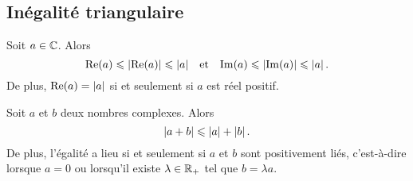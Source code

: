 \documentclass{magnoliaold}
\begin{document}
\subsection{Inégalité triangulaire}


\begin{proposition}[utile=-3]
Soit $a\in\mathbb{C}$. Alors
\[\mathop{\rm Re}(a)\leqslant\left|\mathop{\rm Re}(a)\right|\leqslant\left|a\right| \quad\!\text{et}\quad\!
  \mathop{\rm Im}(a)\leqslant\left|\mathop{\rm Im}(a)\right|\leqslant\left|a\right|.\]
De plus, $\mathop{\rm Re}(a)=\left|a\right|$ si et seulement si $a$ est réel positif.
\end{proposition}


\begin{proposition}[utile=3, nom=Inégalité triangulaire]
Soit $a$ et $b$ deux nombres complexes. Alors
\[\left|a+b\right|\leqslant\left|a\right|+\left|b\right|.\]
De plus, l'égalité a lieu si et seulement si  $a$ et $b$ sont positivement
liés, c'est-à-dire lorsque $a=0$ ou lorsqu'il existe $\lambda\in\mathbb{R}_+$ tel que
$b=\lambda a$.
\end{proposition}
\end{document}
